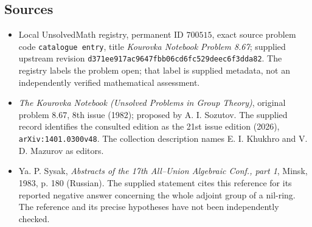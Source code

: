 \documentclass[11pt]{article}
\begin{document}
\subsection{Sources}
\begin{itemize}
\item Local UnsolvedMath registry, permanent ID \(700515\), exact source problem code \texttt{catalogue entry}, title \emph{Kourovka Notebook Problem 8.67}; supplied upstream revision \texttt{d371ee917ac9647fbb06cd6fc529deec6f3dda82}. The registry labels the problem open; that label is supplied metadata, not an independently verified mathematical assessment.
\item \emph{The Kourovka Notebook (Unsolved Problems in Group Theory)}, original problem 8.67, 8th issue (1982); proposed by A. I. Sozutov. The supplied record identifies the consulted edition as the 21st issue edition (2026), \texttt{arXiv:1401.0300v48}. The collection description names E. I. Khukhro and V. D. Mazurov as editors.
\item Ya. P. Sysak, \emph{Abstracts of the 17th All--Union Algebraic Conf., part 1}, Minsk, 1983, p. 180 (Russian). The supplied statement cites this reference for its reported negative answer concerning the whole adjoint group of a nil-ring. The reference and its precise hypotheses have not been independently checked.
\end{itemize}
\end{document}
